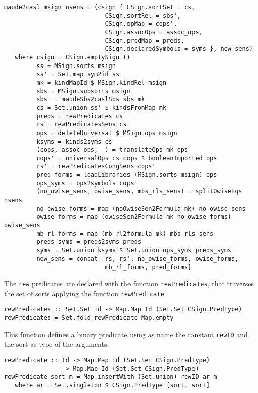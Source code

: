{\codesize
\begin{verbatim}
maude2casl msign nsens = (csign { CSign.sortSet = cs,
                            CSign.sortRel = sbs',
                            CSign.opMap = cops',
                            CSign.assocOps = assoc_ops,
                            CSign.predMap = preds,
                            CSign.declaredSymbols = syms }, new_sens)
   where csign = CSign.emptySign ()
         ss = MSign.sorts msign
         ss' = Set.map sym2id ss
         mk = kindMapId $ MSign.kindRel msign
         sbs = MSign.subsorts msign
         sbs' = maudeSbs2caslSbs sbs mk
         cs = Set.union ss' $ kindsFromMap mk
         preds = rewPredicates cs
         rs = rewPredicatesSens cs
         ops = deleteUniversal $ MSign.ops msign
         ksyms = kinds2syms cs
         (cops, assoc_ops, _) = translateOps mk ops
         cops' = universalOps cs cops $ booleanImported ops
         rs' = rewPredicatesCongSens cops'
         pred_forms = loadLibraries (MSign.sorts msign) ops
         ops_syms = ops2symbols cops'
         (no_owise_sens, owise_sens, mbs_rls_sens) = splitOwiseEqs nsens
         no_owise_forms = map (noOwiseSen2Formula mk) no_owise_sens
         owise_forms = map (owiseSen2Formula mk no_owise_forms) owise_sens
         mb_rl_forms = map (mb_rl2formula mk) mbs_rls_sens
         preds_syms = preds2syms preds
         syms = Set.union ksyms $ Set.union ops_syms preds_syms
         new_sens = concat [rs, rs', no_owise_forms, owise_forms,
                            mb_rl_forms, pred_forms]
\end{verbatim}
}

The \verb"rew" predicates are declared with the function
\verb"rewPredicates", that traverses the set of sorts applying
the function \verb"rewPredicate":

{\codesize
\begin{verbatim}
rewPredicates :: Set.Set Id -> Map.Map Id (Set.Set CSign.PredType)
rewPredicates = Set.fold rewPredicate Map.empty
\end{verbatim}
}

This function defines a binary predicate using as name the constant
\verb"rewID" and the sort as type of the arguments:

{\codesize
\begin{verbatim}
rewPredicate :: Id -> Map.Map Id (Set.Set CSign.PredType)
                -> Map.Map Id (Set.Set CSign.PredType)
rewPredicate sort m = Map.insertWith (Set.union) rewID ar m
   where ar = Set.singleton $ CSign.PredType [sort, sort]
\end{verbatim}
}

